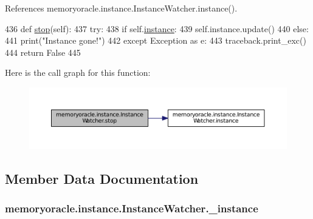 References memoryoracle.\+instance.\+Instance\+Watcher.\+instance().


\begin{DoxyCode}
436     \textcolor{keyword}{def }\hyperlink{classmemoryoracle_1_1instance_1_1InstanceWatcher_a1dfaed2006ecf495ede2ab638de9f7db}{stop}(self):
437         \textcolor{keywordflow}{try}:
438             \textcolor{keywordflow}{if} self.\hyperlink{classmemoryoracle_1_1instance_1_1InstanceWatcher_a80c73a0d5b32d62848c3df462ff83dcd}{instance}:
439                 self.instance.update()
440             \textcolor{keywordflow}{else}:
441                 print(\textcolor{stringliteral}{"Instance gone!"})
442         \textcolor{keywordflow}{except} Exception \textcolor{keyword}{as} e:
443             traceback.print\_exc()
444         \textcolor{keywordflow}{return} \textcolor{keyword}{False}
445 
\end{DoxyCode}


Here is the call graph for this function\+:\nopagebreak
\begin{figure}[H]
\begin{center}
\leavevmode
\includegraphics[width=350pt]{classmemoryoracle_1_1instance_1_1InstanceWatcher_a1dfaed2006ecf495ede2ab638de9f7db_cgraph}
\end{center}
\end{figure}




\subsection{Member Data Documentation}
\hypertarget{classmemoryoracle_1_1instance_1_1InstanceWatcher_a01830207137ed5f292f0ca46a669a05e}{}
\subsubsection[{\+\_\+instance}]{\setlength{\rightskip}{0pt plus 5cm}memoryoracle.\+instance.\+Instance\+Watcher.\+\_\+instance\hspace{0.3cm}{\ttfamily [private]}}\label{classmemoryoracle_1_1instance_1_1InstanceWatcher_a01830207137ed5f292f0ca46a669a05e}


